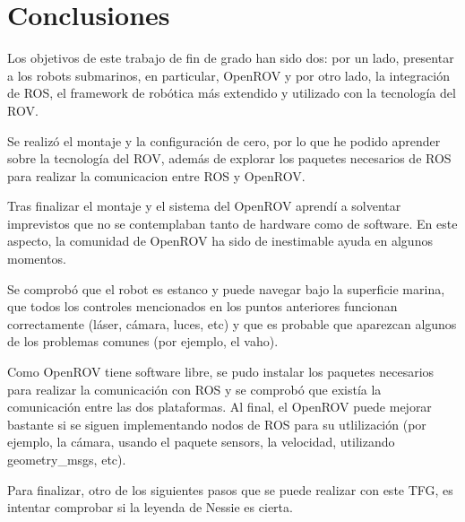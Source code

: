 \chapter{Conclusiones}
\label{cap:conclusiones}

Los objetivos de este trabajo de fin de grado han sido dos: por un lado, presentar a los robots submarinos, en particular, OpenROV y por otro lado, la integración de ROS, el framework de robótica más extendido y utilizado con la tecnología del ROV.

Se realizó el montaje y la configuración de cero, por lo que he podido aprender sobre la tecnología del ROV, además de explorar los paquetes necesarios de ROS para realizar la comunicacion entre ROS y OpenROV.

Tras finalizar el montaje y el sistema del OpenROV aprendí a solventar imprevistos que no se contemplaban tanto de hardware como de software. En este aspecto, la comunidad de OpenROV ha sido de inestimable ayuda en algunos momentos.

Se comprobó que el robot es estanco y puede navegar bajo la superficie marina, que todos los controles mencionados en los puntos anteriores funcionan correctamente (láser, cámara, luces, etc) y que es probable que aparezcan algunos de los problemas comunes (por ejemplo, el vaho).

Como OpenROV tiene software libre, se pudo instalar los paquetes necesarios para realizar la comunicación con ROS y se comprobó que existía la comunicación entre las dos plataformas. Al final, el OpenROV puede mejorar bastante si se siguen implementando nodos de ROS para su utlilización (por ejemplo, la cámara, usando el paquete sensors, la velocidad, utilizando geometry\_msgs, etc). 

Para finalizar, otro de los siguientes pasos que se puede realizar con este TFG, es intentar comprobar si la leyenda de Nessie es cierta.

